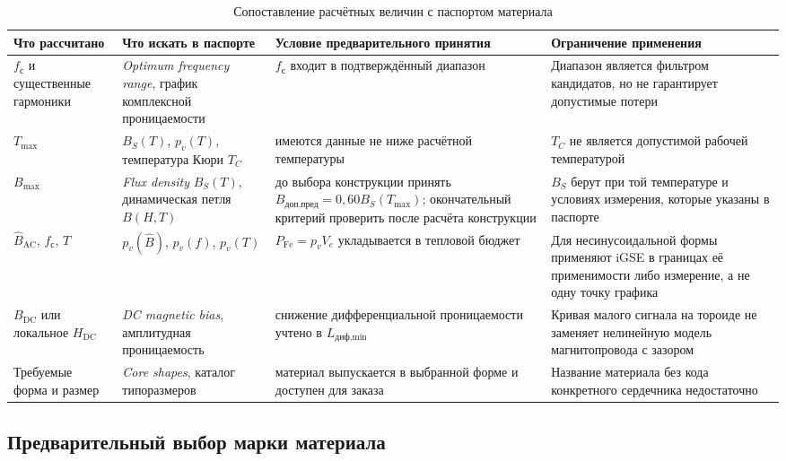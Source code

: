 \documentclass[14pt,a4paper]{extarticle}
\begin{document}
\begin{table}[H]
\caption{Сопоставление расчётных величин с паспортом материала}
\label{tab:material-datasheet-map}
\centering
\scriptsize
\begin{tabularx}{\textwidth}{>{\raggedright\arraybackslash}p{29mm}
>{\raggedright\arraybackslash}p{38mm}
>{\raggedright\arraybackslash}p{47mm} X}
\toprule
Что рассчитано & Что искать в паспорте & Условие предварительного принятия &
Ограничение применения \\
\midrule
$f_{\text{с}}$ и существенные гармоники &
\textit{Optimum frequency range}, график комплексной проницаемости &
$f_{\text{с}}$ входит в подтверждённый диапазон &
Диапазон является фильтром кандидатов, но не гарантирует допустимые потери \\
$T_{\max}$ &
$B_S(T)$, $p_v(T)$, температура Кюри $T_C$ &
имеются данные не ниже расчётной температуры &
$T_C$ не является допустимой рабочей температурой \\
$B_{\max}$ &
\textit{Flux density} $B_S(T)$, динамическая петля $B(H,T)$ &
до выбора конструкции принять
$B_{\text{доп,пред}}=0{,}60B_S(T_{\max})$; окончательный критерий
проверить после расчёта конструкции &
$B_S$ берут при той температуре и условиях измерения, которые указаны в
паспорте \\
$\widehat B_{\text{AC}}$, $f_{\text{с}}$, $T$ &
$p_v(\widehat B)$, $p_v(f)$, $p_v(T)$ &
$P_{\text{Fe}}=p_vV_e$ укладывается в тепловой бюджет &
Для несинусоидальной формы применяют iGSE в границах её применимости либо
измерение, а не одну точку графика \\
$B_{\text{DC}}$ или локальное $H_{\text{DC}}$ &
\textit{DC magnetic bias}, амплитудная проницаемость &
снижение дифференциальной проницаемости учтено в $L_{\text{диф,min}}$ &
Кривая малого сигнала на тороиде не заменяет нелинейную модель
магнитопровода с зазором \\
Требуемые форма и размер &
\textit{Core shapes}, каталог типоразмеров &
материал выпускается в выбранной форме и доступен для заказа &
Название материала без кода конкретного сердечника недостаточно \\
\bottomrule
\end{tabularx}
\end{table}

\subsection{Предварительный выбор марки материала}
\label{subsec:material-choice}
\end{document}
